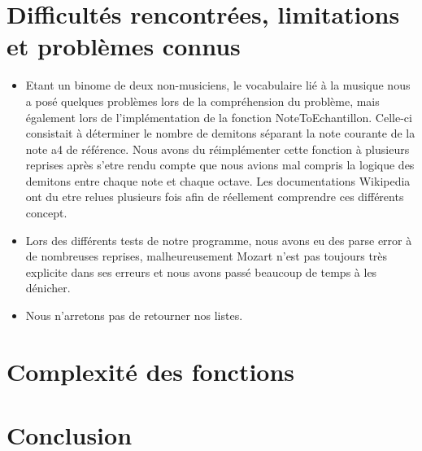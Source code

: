 \documentclass[a4paper,12pt]{report}
\begin{document}
\section{Difficultés rencontrées, limitations et problèmes connus}
\begin{itemize}
\item Etant un binome de deux non-musiciens, le vocabulaire lié à la musique nous a posé quelques problèmes lors de la compréhension du problème, mais également lors de l'implémentation de la fonction NoteToEchantillon. Celle-ci consistait à déterminer le nombre de demitons séparant la note courante de la note a4 de référence. Nous avons du réimplémenter cette fonction à plusieurs reprises après s'etre rendu compte que nous avions mal compris la logique des demitons entre chaque note et chaque octave. Les documentations Wikipedia ont du etre relues plusieurs fois afin de réellement comprendre ces différents concept.

\item Lors des différents tests de notre programme, nous avons eu des parse error à de nombreuses reprises, malheureusement Mozart n'est pas toujours très explicite dans ses erreurs et nous avons passé beaucoup de temps à les dénicher. 
 
\item Nous n'arretons pas de retourner nos listes.
\end{itemize}


\section{Complexité des fonctions}



\section{Conclusion}
\end{document}
